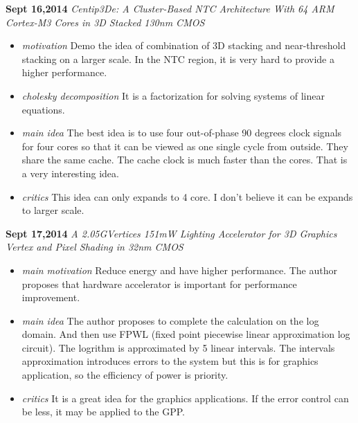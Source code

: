 \documentclass[]{article}
\begin{document}
\noindent \textbf{Sept 16,2014}
\textit{Centip3De: A Cluster-Based NTC Architecture With 64 ARM Cortex-M3 Cores in 3D Stacked 130nm CMOS }
\indent     \begin{itemize}

            \item \textit{motivation} Demo the idea of combination of 3D stacking and near-threshold stacking on a larger
            scale. In the NTC region, it is very hard to provide a higher performance.

            \item \textit{cholesky decomposition} It is a factorization for solving systems of linear equations.

            \item \textit{main idea} The best idea is to use four out-of-phase 90 degrees clock signals for four cores so
            that it can be viewed as one single cycle from outside. They share the same cache.
            The cache clock is much faster than the cores. That is a very interesting idea.

            \item \textit{critics} This idea can only expands to 4 core. I don't believe it can be expands to larger scale.
        \end{itemize}

\noindent \textbf{Sept 17,2014}
\textit{A 2.05GVertices 151mW Lighting Accelerator for 3D Graphics Vertex and Pixel Shading in 32nm CMOS}
\indent     \begin{itemize}
            \item \textit{main motivation} Reduce energy and have higher performance. The author proposes that hardware
            accelerator is important for performance improvement.
            \item \textit{main idea} The author proposes to complete the calculation on the log domain. And then use FPWL
            (fixed point piecewise linear approximation log circuit). The logrithm is approximated by 5 linear intervals.
            The intervals approximation introduces errors to the system but this is for graphics application, so the 
            efficiency of power is priority.
            \item \textit{critics} It is a great idea for the graphics applications. If the error control can be less, it
            may be applied to the GPP.
        \end{itemize}
\end{document}

